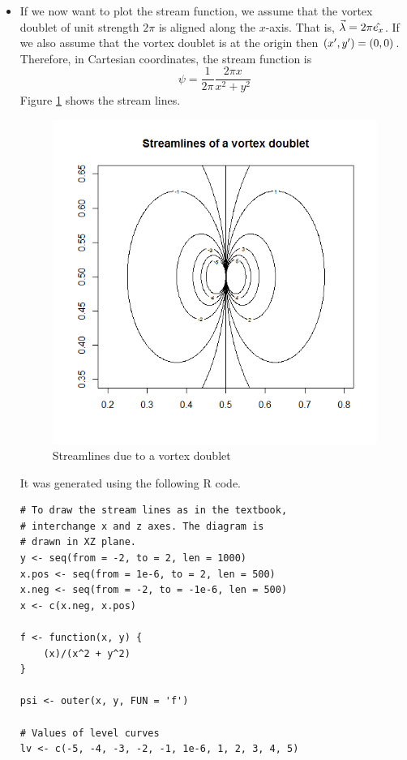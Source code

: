 \begin{itemize}
\item If we now want to plot the stream function, we assume that the vortex doublet of unit strength $2\pi$ is aligned along the $x$-axis. That is, $\vec{\lambda} = 2\pi\hat{e_{x}}$. 
If we also assume that the vortex doublet is at the origin then $(x^\prime, y^\prime) = (0, 0)$. Therefore, in Cartesian coordinates, the stream function is
\[
\psi = \frac{1}{2\pi}\frac{2\pi x}{x^2 + y^2}
\]
Figure \ref{c2f4} shows the stream lines.
\begin{figure}[!ht]
\centering
\centerline{\includegraphics[scale=.5]{c2f4}}
\caption{Streamlines due to a vortex doublet}
\label{c2f4}
\end{figure}

It was generated using the following R code.
\begin{verbatim}
# To draw the stream lines as in the textbook, 
# interchange x and z axes. The diagram is 
# drawn in XZ plane.
y <- seq(from = -2, to = 2, len = 1000)
x.pos <- seq(from = 1e-6, to = 2, len = 500)
x.neg <- seq(from = -2, to = -1e-6, len = 500)
x <- c(x.neg, x.pos)

f <- function(x, y) {
	(x)/(x^2 + y^2)
}

psi <- outer(x, y, FUN = 'f')

# Values of level curves
lv <- c(-5, -4, -3, -2, -1, 1e-6, 1, 2, 3, 4, 5) 


\end{verbatim}
\end{itemize}
